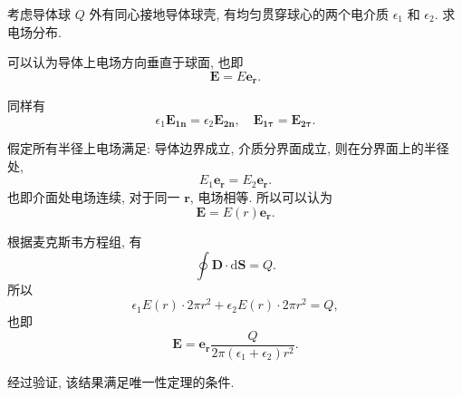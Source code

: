 \begin{exampleprob}
    考虑导体球 $Q$ 外有同心接地导体球壳, 有均匀贯穿球心的两个电介质 $\epsilon_1$ 和 $\epsilon_2$. 求电场分布.

    \begin{solution}
        可以认为导体上电场方向垂直于球面, 也即
        \begin{equation*}
            \bm{E}=E\bm{e_r}.
        \end{equation*}

        同样有
        \begin{equation*}
            \epsilon_1\bm{E_{1n}}=\epsilon_2\bm{E_{2n}}, \quad \bm{E_{1\tau}}=\bm{E_{2\tau}}.
        \end{equation*}

        假定所有半径上电场满足: 导体边界成立, 介质分界面成立, 则在分界面上的半径处,
        \begin{equation*}
            E_1\bm{e_r}=E_2\bm{e_r}.
        \end{equation*}
        也即介面处电场连续, 对于同一 $\bm{r}$, 电场相等. 所以可以认为
        \begin{equation*}
            \bm{E}=E(r)\bm{e_r}.
        \end{equation*}

        根据麦克斯韦方程组, 有
        \begin{equation*}
            \oint\bm{D}\cdot\mathrm{d}\bm{S}=Q.
        \end{equation*}
        所以
        \begin{equation*}
            \epsilon_1E(r)\cdot 2\pi r^2+\epsilon_2E(r)\cdot 2\pi r^2=Q,
        \end{equation*}
        也即
        \begin{equation*}
            \bm{E}=\bm{e_r}\frac{Q}{2\pi(\epsilon_1+\epsilon_2)r^2}.
        \end{equation*}

        经过验证, 该结果满足唯一性定理的条件.
    \end{solution}
\end{exampleprob}
